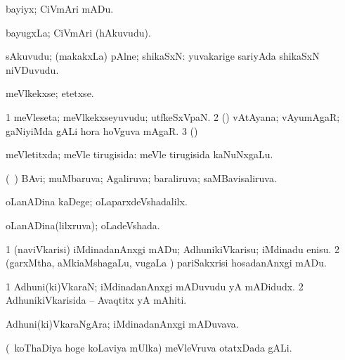 {{\bentry
{} 
\gl{\sakirx}
\expl{}
\bmng
bayiyx; CiVmAri mADu. 
\emng
\eentry

\bentry
{} 
\gl{\nA}
\expl{}
\bmng
bayugxLa; CiVmAri (hAkuvudu). 
\emng
\eentry

\bentry
{} 
\gl{\nA}
\expl{}
\bmng
sAkuvudu; (makakxLa) pAlne; shikaSxN:  yuvakarige sariyAda shikaSxN niVDuvudu. 
\emng
\eentry

\bentry
{} 
\gl{\sakirx}
\bmng
meVlkekxse; etetxse. 
\emng
\eentry

\bentry
{} 
\gl{\nA}
\expl{}
\bmng
\bnum
\num{1} meVleseta; meVlkekxseyuvudu; utfkeSxVpaN. 
\num{2} (\gaNi) vAtAyana; vAyumAgaR; gaNiyiMda gALi hora hoVguva mAgaR. 
\num{3} (\BUvi)  
\enum
\emng
\eentry

\bentry
{} 
\gl{\gu}
\expl{}
\bmng
meVletitxda; meVle tirugisida:  meVle tirugisida kaNuNxgaLu. 
\emng
\eentry

\bentry
{} 
\gl{\gu}
\expl{}
\bmng
(\kanmu\ \ame) BAvi; muMbaruva; Agaliruva; baraliruva; saMBavisaliruva. 
\emng
\eentry

\bentry
{} 
\gl{\kirxvi}
\expl{}
\bmng
oLanADina kaDege; oLaparxdeVshadalilx. 
\emng
\eentry

\bentry
{} 
\gl{\gu}
\expl{}
\bmng
oLanADina(lilxruva); oLadeVshada. 
\emng
\eentry

\bentry
{} 
\gl{\sakirx}
\expl{}
\bmng
\bnum
\num{1} (naviVkarisi) iMdinadanAnxgi mADu; AdhunikiVkarisu; iMdinadu enisu. 
\num{2} (garxMtha, aMkiaMshagaLu, \mo vugaLa \vi) pariSakxrisi hosadanAnxgi mADu. 
\enum
\emng
\eentry

\bentry
{} 
\gl{\nA}
\expl{}
\bmng
\bnum
\num{1} Adhuni(ki)VkaraN; iMdinadanAnxgi mADuvudu yA mADidudx. 
\num{2} AdhunikiVkarisida -- Avaqtitx yA mAhiti. 
\enum
\emng
\eentry

\bentry
{} 
\gl{\nA}
\expl{}
\bmng
Adhuni(ki)VkaraNgAra; iMdinadanAnxgi mADuvava. 
\emng
\eentry

\bentry
{}
\gl{\nA}
\expl{}
\bmng
(\kanmu\ koThaDiya hoge koLaviya mUlka) meVleVruva otatxDada gALi. 
\emng
\eentry

}}
